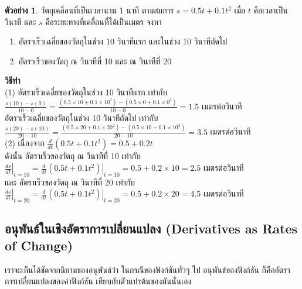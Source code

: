 \documentclass[
]{book}
\theoremstyle{definition}
\theoremstyle{definition}
\newtheorem{example}{ตัวอย่าง}[chapter]
\theoremstyle{definition}
\theoremstyle{definition}
\theoremstyle{remark}
\begin{document}
\begin{example}

วัตถุเคลื่อนที่เป็นเวลานาน 1 นาที ตามสมการ \(s=0.5t+0.1t^2\) เมื่อ \(t\) คือเวลาเป็นวินาที
และ \(s\) คือระยะทางที่เคลื่อนที่ได้เป็นเมตร จงหา

\begin{enumerate}
\def\labelenumi{(\arabic{enumi})}
\item
  อัตราเร็วเฉลี่ยของวัตถุในช่วง 10 วินาทีแรก และในช่วง 10 วินาทีถัดไป
\item
  อัตราเร็วของวัตถุ ณ วินาทีที่ 10 และ ณ วินาทีที่ 20
\end{enumerate}

\end{example}

\textbf{วิธีทำ}\\
(1) อัตราเร็วเฉลี่ยของวัตถุในช่วง 10 วินาทีแรก เท่ากับ\\
\(\displaystyle\frac{s(10)-s(0)}{10-0}
       =\frac{(0.5\times10+0.1\times10^2)-(0.5\times0+0.1\times0^2)}{10-0}=1.5\)
เมตรต่อวินาที\\
อัตราเร็วเฉลี่ยของวัตถุในช่วง 10 วินาทีถัดไป เท่ากับ\\
\(\displaystyle\frac{s(20)-s(10)}{20-10}
       =\frac{(0.5\times20+0.1\times20^2)-(0.5\times10+0.1\times10^2)}{20-10}=3.5\)
เมตรต่อวินาที\\
(2) เนื่องจาก
\(\displaystyle\frac{d}{dt}\left(0.5t+0.1t^2\right)=0.5+0.2t\)\\
ดังนั้น อัตราเร็วของวัตถุ ณ วินาทีที่ 10 เท่ากับ\\
\(\displaystyle\left.\frac{ds}{dt}\right|_{t=10}
       =\left.\frac{d}{dt}\left(0.5t+0.1t^2\right)\right|_{t=10}=0.5+0.2\times10=2.5\)
เมตรต่อวินาที\\
และ อัตราเร็วของวัตถุ ณ วินาทีที่ 20 เท่ากับ\\
\(\displaystyle\left.\frac{ds}{dt}\right|_{t=20}
       =\left.\frac{d}{dt}\left(0.5t+0.1t^2\right)\right|_{t=20}=0.5+0.2\times20=4.5\)
เมตรต่อวินาที

\subsection{อนุพันธ์ในเชิงอัตราการเปลี่ยนแปลง (Derivatives as Rates of Change)}\label{uxe2duxe19uxe1euxe19uxe18uxe43uxe19uxe40uxe0auxe07uxe2duxe15uxe23uxe32uxe01uxe32uxe23uxe40uxe1buxe25uxe22uxe19uxe41uxe1buxe25uxe07-derivatives-as-rates-of-change}

เราจะเห็นได้ชัดจากนิยามของอนุพันธ์ว่า ในกรณีของฟังก์ชันทั่วๆ ไป อนุพันธ์ของฟังก์ชัน
ก็คืออัตราการเปลี่ยนแปลงของค่าฟังก์ชัน เทียบกับตัวแปรต้นของมันนั่นเอง
\end{document}
